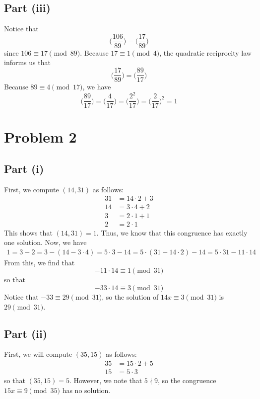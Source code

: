 \documentclass[12pt]{article}
\begin{document}
\subsection*{Part (iii)}
Notice that
\[
\bigg(\frac{106}{89}\bigg) = \bigg(\frac{17}{89}\bigg) 
\] since $106 \equiv 17 \pmod{89}$. Because $17 \equiv 1 \pmod{4}$, the quadratic reciprocity law informs us that
\[
\bigg(\frac{17}{89}\bigg) = \bigg(\frac{89}{17}\bigg)
\] Because $89 \equiv 4 \pmod{17}$, we have
\[
\bigg(\frac{89}{17}\bigg) = \bigg(\frac{4}{17}\bigg) = \bigg(\frac{2^2}{17}\bigg) = \bigg(\frac{2}{17}\bigg)^2 = 1
\]
\newpage
\section*{Problem 2}
\subsection*{Part (i)}
First, we compute $(14, 31)$ as follows:
\begin{align*}
31 & = 14 \cdot 2 + 3\\
14 &= 3 \cdot 4 + 2\\
3 &= 2 \cdot 1 + 1\\
2 &= 2 \cdot 1
\end{align*} This shows that $(14,31) = 1$. Thus, we know that this congruence has exactly one solution. Now, we have
\begin{align*}
1= 3 - 2 = 3 - (14 - 3 \cdot 4) = 5 \cdot 3 - 14 = 5 \cdot (31 - 14 \cdot 2) - 14 = 5 \cdot 31 - 11 \cdot 14
\end{align*} From this, we find that
\[
-11\cdot 14 \equiv 1 \pmod{31}
\] so that
\[
-33 \cdot 14 \equiv 3 \pmod{31}
\] Notice that $-33 \equiv 29 \pmod{31}$, so the solution of $14x \equiv 3 \pmod{31}$ is $29 \pmod{31}$.
\newpage
\subsection*{Part (ii)}
First, we will compute $(35,15)$ as follows:
\begin{align*}
35 &= 15 \cdot 2 + 5\\
15 &= 5 \cdot 3
\end{align*} so that $(35,15) = 5$. However, we note that $5 \nmid 9$, so the congruence $15x \equiv 9 \pmod{35}$ has no solution.
\newpage
\end{document}
